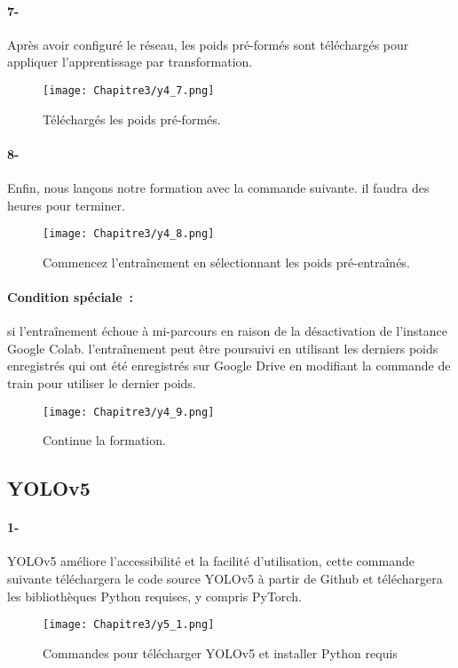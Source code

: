      \paragraph{7-} Après avoir configuré le réseau, les poids pré-formés sont téléchargés pour appliquer l'apprentissage par transformation.
     \begin{figure}[H]
               \centering
               \texttt{[image: Chapitre3/y4\_7.png]}
               \caption{Téléchargés les poids pré-formés.}
               \label{y4_7}
               \end{figure}
      
     \paragraph{8-} Enfin, nous lançons notre formation avec la commande suivante. il faudra des heures pour terminer.
     \begin{figure}[H]
               \centering
               \texttt{[image: Chapitre3/y4\_8.png]}
               \caption{Commencez l'entraînement en sélectionnant les poids pré-entraînés.}
               \label{y4_8}
               \end{figure}
      
     \paragraph{Condition spéciale :} si l'entraînement échoue à mi-parcours en raison de la désactivation de l'instance Google Colab. l'entraînement peut être poursuivi en utilisant les derniers poids enregistrés qui ont été enregistrés sur Google Drive en modifiant la commande de train pour utiliser le dernier poids.
     \begin{figure}[H]
               \centering
               \texttt{[image: Chapitre3/y4\_9.png]}
               \caption{Continue la formation.}
               \label{y4_9}
               \end{figure}
      
               

     \subsection{YOLOv5}
     \paragraph{1-} YOLOv5 améliore l'accessibilité et la facilité d'utilisation, cette commande suivante téléchargera le code source YOLOv5 à partir de Github et téléchargera les bibliothèques Python requises, y compris PyTorch.
     \begin{figure}[H]
               \centering
               \texttt{[image: Chapitre3/y5\_1.png]}
               \caption{Commandes pour télécharger YOLOv5 et installer Python requis}
               \label{y5_1}
               \end{figure}
               
